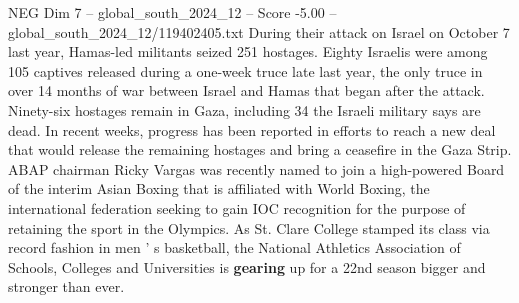 \begin{textsample}{NEG Dim 7 – global\_south\_2024\_12 – Score -5.00 – global\_south\_2024\_12/119402405.txt}
During their attack on Israel on October 7 last year, Hamas-led militants seized 251 hostages.
Eighty Israelis were among 105 captives released during a one-week truce late last year, the only truce in over 14 months of war between Israel and Hamas that began after the attack.
Ninety-six hostages remain in Gaza, including 34 the Israeli military says are dead.
In recent weeks, progress has been reported in efforts to reach a new deal that would release the remaining hostages and bring a ceasefire in the Gaza Strip.
ABAP chairman Ricky Vargas was recently named to join a high-powered Board of the interim Asian Boxing that is affiliated with World Boxing, the international federation seeking to gain IOC recognition for the purpose of retaining the sport in the Olympics.
As St.
Clare College stamped its class via record fashion in men ' s basketball, the National Athletics Association of Schools, Colleges and Universities is \textbf{gearing} up for a 22nd season bigger and stronger than ever.

\end{textsample}

